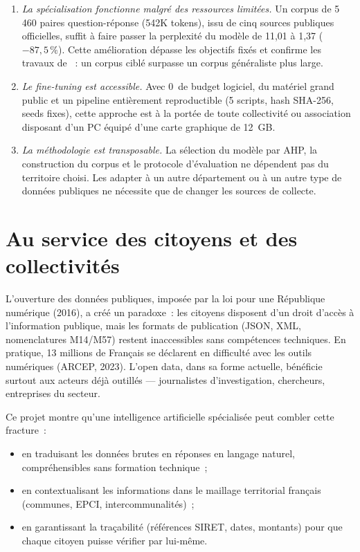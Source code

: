 \begin{enumerate}
    \item \textit{La spécialisation fonctionne malgré des ressources limitées.} Un corpus de 5\,460 paires question-réponse (542K tokens), issu de cinq sources publiques officielles, suffit à faire passer la perplexité du modèle de 11,01 à 1,37 ($-87{,}5\,\%$). Cette amélioration dépasse les objectifs fixés et confirme les travaux de \citet{gururangan2020dont}~: un corpus ciblé surpasse un corpus généraliste plus large.
    
    \item \textit{Le fine-tuning est accessible.} Avec 0\,\texteuro{} de budget logiciel, du matériel grand public et un pipeline entièrement reproductible (5 scripts, hash SHA-256, seeds fixes), cette approche est à la portée de toute collectivité ou association disposant d'un PC équipé d'une carte graphique de 12~GB.
    
    \item \textit{La méthodologie est transposable.} La sélection du modèle par AHP, la construction du corpus et le protocole d'évaluation ne dépendent pas du territoire choisi. Les adapter à un autre département ou à un autre type de données publiques ne nécessite que de changer les sources de collecte.
\end{enumerate}

\section{Au service des citoyens et des collectivités}

L'ouverture des données publiques, imposée par la loi pour une République numérique (2016), a créé un paradoxe~: les citoyens disposent d'un droit d'accès à l'information publique, mais les formats de publication (JSON, XML, nomenclatures M14/M57) restent inaccessibles sans compétences techniques. En pratique, 13 millions de Français se déclarent en difficulté avec les outils numériques (ARCEP, 2023). L'open data, dans sa forme actuelle, bénéficie surtout aux acteurs déjà outillés --- journalistes d'investigation, chercheurs, entreprises du secteur.

Ce projet montre qu'une intelligence artificielle spécialisée peut combler cette fracture~:

\begin{itemize}
    \item en traduisant les données brutes en réponses en langage naturel, compréhensibles sans formation technique~;
    \item en contextualisant les informations dans le maillage territorial français (communes, EPCI, intercommunalités)~;
    \item en garantissant la traçabilité (références SIRET, dates, montants) pour que chaque citoyen puisse vérifier par lui-même.
\end{itemize}

